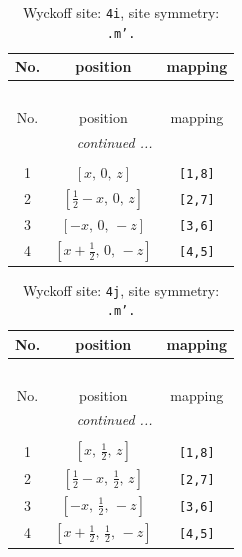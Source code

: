 \documentclass[fleqn,8pt]{jsarticle}
\begin{document}
\renewcommand{\arraystretch}{1.2}
\begin{longtable}{ccc}
\caption{Wyckoff site: {\tt 4i}, site symmetry: {\tt .m'.}}
 \\
 \hline \hline
No. & position & mapping \\ \hline \endfirsthead

\multicolumn{2}{l}{\tablename\ \thetable{}} \\
 \hline \hline
No. & position & mapping \\ \hline \endhead

 \hline \hline
\multicolumn{2}{r}{\footnotesize\it continued ...} \\ \endfoot

 \hline \hline
\multicolumn{2}{r}{} \\ \endlastfoot

1 & $\left[ x,\, 0,\, z \right]$ & {\tt [1,8]} \\ \hline
2 & $\left[ \frac{1}{2} - x,\, 0,\, z \right]$ & {\tt [2,7]} \\ \hline
3 & $\left[ - x,\, 0,\, - z \right]$ & {\tt [3,6]} \\ \hline
4 & $\left[ x + \frac{1}{2},\, 0,\, - z \right]$ & {\tt [4,5]} \\
\end{longtable}
\renewcommand{\arraystretch}{1.2}
\begin{longtable}{ccc}
\caption{Wyckoff site: {\tt 4j}, site symmetry: {\tt .m'.}}
 \\
 \hline \hline
No. & position & mapping \\ \hline \endfirsthead

\multicolumn{2}{l}{\tablename\ \thetable{}} \\
 \hline \hline
No. & position & mapping \\ \hline \endhead

 \hline \hline
\multicolumn{2}{r}{\footnotesize\it continued ...} \\ \endfoot

 \hline \hline
\multicolumn{2}{r}{} \\ \endlastfoot

1 & $\left[ x,\, \frac{1}{2},\, z \right]$ & {\tt [1,8]} \\ \hline
2 & $\left[ \frac{1}{2} - x,\, \frac{1}{2},\, z \right]$ & {\tt [2,7]} \\ \hline
3 & $\left[ - x,\, \frac{1}{2},\, - z \right]$ & {\tt [3,6]} \\ \hline
4 & $\left[ x + \frac{1}{2},\, \frac{1}{2},\, - z \right]$ & {\tt [4,5]} \\
\end{longtable}
\end{document}
